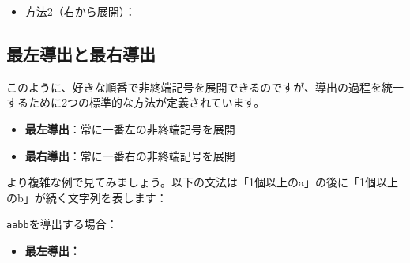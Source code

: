 \begin{itemize}
\tightlist
\item
  方法2（右から展開）：
\end{itemize}

\begin{Shaded}
\begin{Highlighting}[]
\end{Highlighting}
\end{Shaded}

\hypertarget{chapter4-ux6700ux5de6ux5c0eux51faux3068ux6700ux53f3ux5c0eux51fa}{%
\subsection{最左導出と最右導出}\label{chapter4-ux6700ux5de6ux5c0eux51faux3068ux6700ux53f3ux5c0eux51fa}}

このように、好きな順番で非終端記号を展開できるのですが、導出の過程を統一するために2つの標準的な方法が定義されています。

\begin{itemize}
\tightlist
\item
  \textbf{最左導出}：常に一番左の非終端記号を展開
\item
  \textbf{最右導出}：常に一番右の非終端記号を展開
\end{itemize}

より複雑な例で見てみましょう。以下の文法は「1個以上のa」の後に「1個以上のb」が続く文字列を表します：

\begin{Shaded}
\begin{Highlighting}[]
\end{Highlighting}
\end{Shaded}

\texttt{aabb}を導出する場合：

\begin{itemize}
\tightlist
\item
  \textbf{最左導出：}
\end{itemize}

\begin{Shaded}
\begin{Highlighting}[]
\end{Highlighting}
\end{Shaded}

